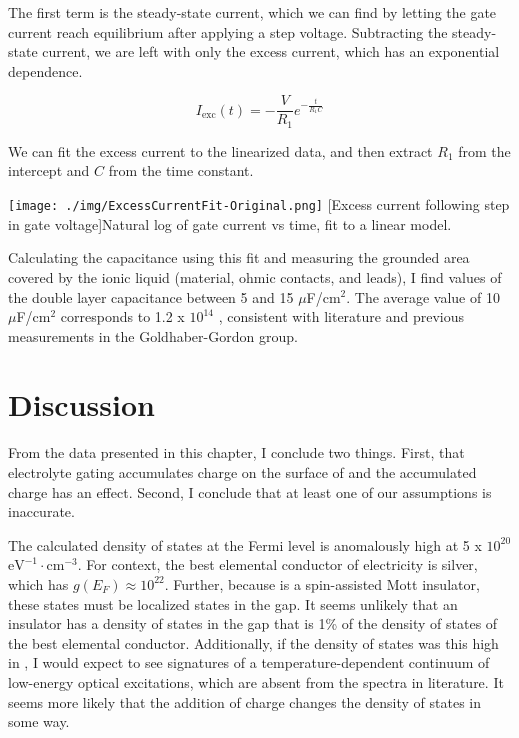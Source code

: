 The first term is the steady-state current, which we can find by letting the gate current reach equilibrium after applying a step voltage. Subtracting the steady-state current, we are left with only the excess current, which has an exponential dependence.

\begin{equation}
I_{\text{exc}}(t) = - \frac{V}{R_{1}} e^{-\frac{t}{R_{1}C}}
\end{equation}

We can fit the excess current to the linearized data, and then extract $R_{1}$ from the intercept and $C$ from the time constant.


\begin{centering}
\texttt{[image: ./img/ExcessCurrentFit-Original.png]}
  \captionsetup{width=0.75\textwidth}
  [Excess current following step in gate voltage]{Natural log of gate current vs time, fit to a linear model.} 
  \label{fig:QuantCharge-02}
\end{centering}

Calculating the capacitance using this fit and measuring the grounded area covered by the ionic liquid (material, ohmic contacts, and leads), I find values of the double layer capacitance between 5 and 15 $\mu$F/cm$^{2}$. The average value of 10 $\mu$F/cm$^{2}$ corresponds to 1.2 x $10^{14}$ \percmsq , consistent with literature and previous measurements in the Goldhaber-Gordon group.

\section{Discussion}

From the data presented in this chapter, I conclude two things. First, that electrolyte gating accumulates charge on the surface of \rucl and the accumulated charge has an effect. Second, I conclude that at least one of our assumptions is inaccurate. 

The calculated density of states at the Fermi level is anomalously high at 5 x $10^{20}$ $\text{eV}^{-1} \cdot \text{cm}^{-3}$. For context, the best elemental conductor of electricity is silver, which has $g(E_{F}) \approx 10^{22}$. Further, because \rucl is a spin-assisted Mott insulator, these states must be localized states in the gap. It seems unlikely that an insulator has a density of states in the gap that is 1\% of the density of states of the best elemental conductor. Additionally, if the density of states was this high in \ruclnospace , I would expect to see signatures of a temperature-dependent continuum of low-energy optical excitations, which are absent from the spectra in literature. It seems more likely that the addition of charge changes the density of states in some way.

